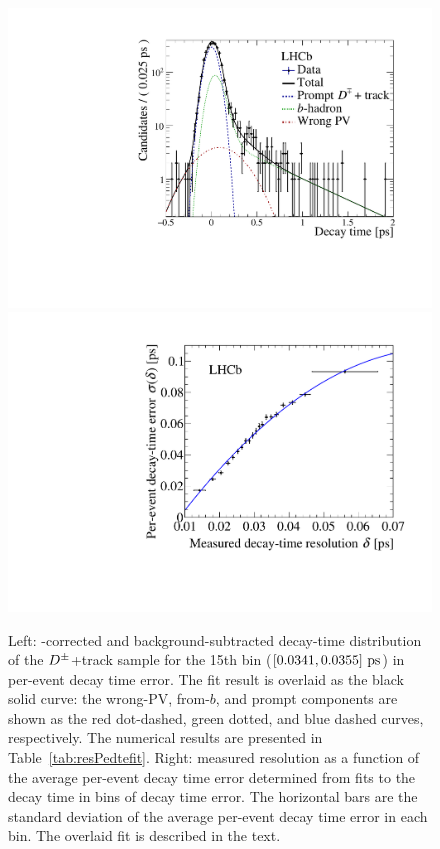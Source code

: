 \begin{figure}[tbp]
	\begin{center}
			 \includegraphics[width=0.49\linewidth]{05DecaytimeFit/figs/resolution/resolution_promptDtimefit_15bin_log_plot.pdf}
			 \includegraphics[width=0.49\linewidth]{05DecaytimeFit/figs/resolution/resolution_pedtecalibpdf_pedtecalib_lin_plot.pdf}	
	\end{center}
        \vspace{-2mm}
			      \caption{Left: \pt-corrected and background-subtracted decay-time distribution of the $D^\pm$+track sample for the 15th bin ($[0.0341,0.0355]~\rm ps$) in per-event decay time error. The fit result is overlaid as the black solid curve: the wrong-PV, from-$b$, and prompt components are shown as the red dot-dashed, green dotted, and blue dashed curves, respectively. The numerical results are presented in Table~\ref{tab:resPedtefit}. Right: measured resolution as a function of the average per-event decay time error determined from fits to the decay time in bins of decay time error. The horizontal bars are the standard deviation of the average per-event decay time error in each bin. The overlaid fit is described in the text.
				  \label{fig:resPedte}}
\end{figure}
